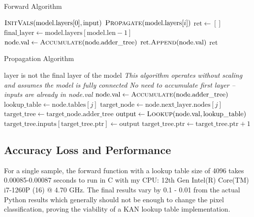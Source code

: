 \documentclass[psamsfonts]{amsart}
\theoremstyle{definition}
\theoremstyle{remark}
\numberwithin{equation}{section}
\begin{document}
\begin{algorithm}[H]
  \caption{Forward Algorithm}
  \label{alg:forward}
  \begin{algorithmic}[1]
    \State $\Call{InitVals}{\text{model}.\text{layers}[0], \text{input}}$
    \State $\Call{Propagate}{\text{model}.\text{layers}[i]}$
    \EndFor
    \State $\text{ret} \gets []$
    \State $\text{final\_layer} \gets \text{model}.\text{layers}[\text{model}.\text{len} - 1]$
    \State $\text{node}.\text{val} \gets \Call{Accumulate}{\text{node}.\text{adder\_tree}}$
    \State $\text{ret}.\Call{Append}{\text{node}.\text{val}}$
    \EndFor
    \State \Return $\text{ret}$
    \EndFunction
  \end{algorithmic}
\end{algorithm}

\begin{algorithm}[H]
  \caption{Propagation Algorithm}
  \label{alg:propagate}
  \begin{algorithmic}[1]
    \Require $\text{layer}$ is not the final layer of the model
    \Statex \textit{This algorithm operates without scaling and assumes the model is fully connected}
    \State \textit{No need to accumulate first layer -- inputs are already in node.val}
    \State $\text{node}.\text{val} \gets \Call{Accumulate}{\text{node}.\text{adder\_tree}}$
    \EndIf
    \State $\text{lookup\_table} \gets \text{node}.\text{tables}[j]$
    \State $\text{target\_node} \gets \text{node}.\text{next\_layer}.\text{nodes}[j]$
    \State $\text{target\_tree} \gets \text{target\_node}.\text{adder\_tree}$
    \State $\text{output} \gets \Call{Lookup}{\text{node}.\text{val}, \text{lookup\_table}}$
    \State $\text{target\_tree}.\text{inputs}[\text{target\_tree}.\text{ptr}] \gets \text{output}$
    \State $\text{target\_tree}.\text{ptr} \gets \text{target\_tree}.\text{ptr} + 1$
    \EndFor
    \EndFor
    \EndFunction
  \end{algorithmic}
\end{algorithm}


\subsection{Accuracy Loss and Performance}
For a single sample, the forward function with a lookup table size of 4096 takes 0.00085-0.00087 seconds to run in C with my CPU: 12th Gen Intel(R) Core(TM) i7-1260P (16) @ 4.70 GHz. The final results vary by 0.1 - 0.01 from the actual Python results which generally should not be enough to change the pixel classification, proving the viability of a KAN lookup table implementation.
\end{document}
